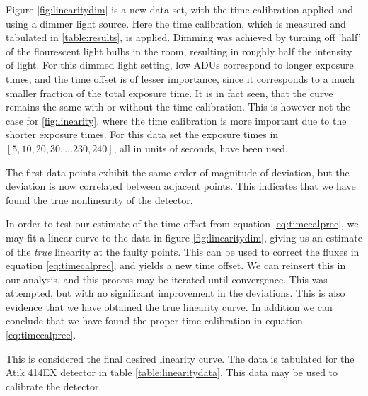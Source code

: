 \documentclass[../main.tex]{subfiles}
\begin{document}
		Figure \ref{fig:linearitydim} is a new data set, with the time calibration applied and using a dimmer light source. Here the time calibration, which is measured and tabulated in \ref{table:results}, is applied. Dimming was achieved by turning off 'half' of the flourescent light bulbs in the room, resulting in roughly half the intensity of light. 
		For this dimmed light setting, low ADUs correspond to longer exposure times, and the time offset is of lesser importance, since it corresponds to a much smaller fraction of the total exposure time. It is in fact seen, that the curve remains the same with or without the time calibration. This is however not the case for \ref{fig:linearity}, where the time calibration is more important due to the shorter exposure times. For this data set the exposure times in
		$[5, 10, 20, 30, \dots 230, 240]$, all in units of seconds, have been used. 
		
		The first data points exhibit the same order of magnitude of deviation, but the deviation is now correlated between adjacent points. This indicates that we have found the true nonlinearity of the detector.
		
		In order to test our estimate of the time offset from equation \ref{eq:timecalprec}, we may fit a linear curve to the data in figure \ref{fig:linearitydim}, giving us an estimate of the \textit{true} linearity at the faulty points. This can be used to correct the fluxes in equation \ref{eq:timecalprec}, and yields a new time offset. We can reinsert this in our analysis, and this process may be iterated until convergence. This was attempted, but with no significant improvement in the deviations. This is also evidence that we have obtained the true linearity curve. In addition we can conclude that we have found the proper time calibration in equation \ref{eq:timecalprec}.
		
		This is considered the final desired linearity curve. The data is tabulated for the Atik 414EX detector in table \ref{table:linearitydata}. This data may be used to calibrate the detector.
		
\end{document}
